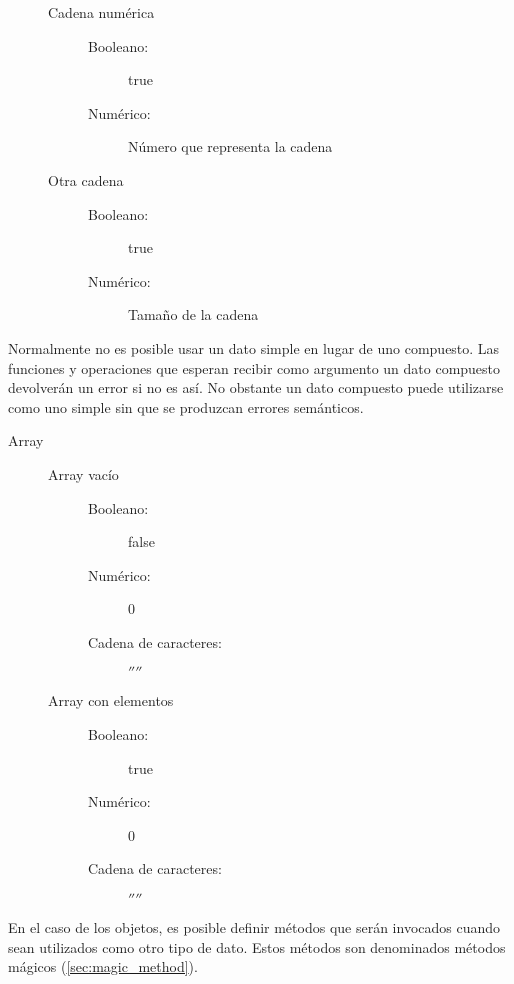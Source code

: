 \begin{description}
\begin{description}
\begin{description}
      \end{description}
   \item[Cadena numérica] \hfill
      \begin{description}
      \item[Booleano:] true 
      \item[Numérico:] Número que representa la cadena
      \end{description}
   \item[Otra cadena] \hfill
      \begin{description}
      \item[Booleano:] true 
      \item[Numérico:] Tamaño de la cadena
      \end{description}
   \end{description}
\end{description}

Normalmente no es posible usar un dato simple en lugar de uno compuesto. Las funciones y operaciones que esperan recibir como argumento
un dato compuesto devolverán un error si no es así. No obstante un dato compuesto puede utilizarse como uno simple sin que se produzcan
errores semánticos.

\begin{description}
\item[Array] \hfill
   \begin{description}
   \item[Array vacío] \hfill
      \begin{description}
      \item[Booleano:] false 
      \item[Numérico:] 0
      \item[Cadena de caracteres:] $''$$''$
      \end{description}
   \item[Array con elementos] \hfill
      \begin{description}
      \item[Booleano:] true 
      \item[Numérico:] 0   
      \item[Cadena de caracteres:] $''$$''$
      \end{description}
   \end{description}
\end{description}

En el caso de los objetos, es posible definir métodos que serán invocados cuando sean utilizados como otro tipo de dato. Estos métodos son denominados 
métodos mágicos (\autoref{sec:magic_method}).

